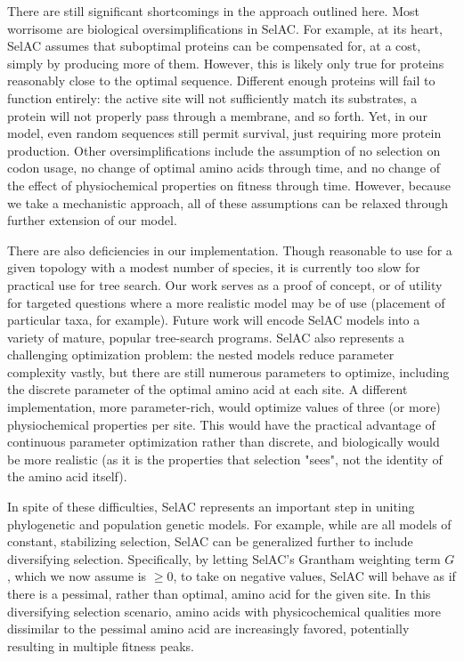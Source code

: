 \documentclass[12pt,letterpaper,fleqn]{article}
\newcommand{\PC}{physicochemical\xspace}
\newcommand{\selac}{SelAC\xspace}
\begin{document}
There are still significant shortcomings in the approach outlined here.
Most worrisome are biological oversimplifications in \selac.
For example, at its heart, \selac assumes that suboptimal proteins can be compensated for, at a cost, simply by producing more of them.
However, this is likely only true for proteins reasonably close to the optimal sequence.
Different enough proteins will fail to function entirely: the active site will not sufficiently match its substrates, a protein will not properly pass through a membrane, and so forth.
Yet, in our model, even random sequences still permit survival, just requiring more protein production.
Other oversimplifications include the assumption of no selection on codon usage, no change of optimal amino acids through time, and no change of the effect of physiochemical properties on fitness through time.
However, because we take a mechanistic approach, all of these assumptions can be relaxed through further extension of our model.

There are also deficiencies in our implementation.
Though reasonable to use for a given topology with a modest number of species, it is currently too slow for practical use for tree search.
Our work serves as a proof of concept, or of utility for targeted questions where a more realistic model may be of use (placement of particular taxa, for example).
Future work will encode \selac models into a variety of mature, popular tree-search programs.
\selac also represents a challenging optimization problem: the nested models reduce parameter complexity vastly, but there are still numerous parameters to optimize, including the discrete parameter of the optimal amino acid at each site.
A different implementation, more parameter-rich, would optimize values of three (or more) physiochemical properties per site.
This would have the practical advantage of continuous parameter optimization rather than discrete, and biologically would be more realistic (as it is the properties that selection "sees", not the identity of the amino acid itself).


In spite of these difficulties, \selac represents an important step in uniting phylogenetic and population genetic models.
For example, while \citet{KoshiEtAl1999,DimmicEtAl2000,KoshiAndGoldstein2001,RobinsonEtAl2003,LartillotAndPhilippe2004,ThorneEtAl2012,RodrigueAndLartillot2014} are all models of constant, stabilizing selection, \selac can be generalized further to include diversifying selection.
Specifically, by letting \selac's Grantham weighting term $G$, which we now assume is $\ge 0$,  to take on negative values, \selac will behave as if there is a pessimal, rather than optimal, amino acid for the given site.
In this diversifying selection scenario, amino acids with \PC qualities more dissimilar to the pessimal amino acid are increasingly favored, potentially resulting in multiple fitness peaks.
\end{document}
